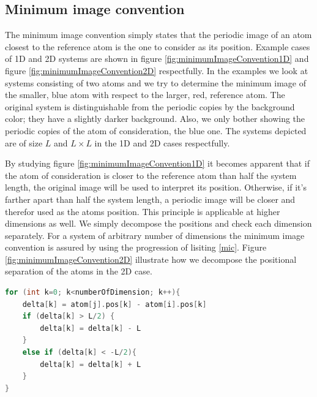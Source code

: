 \documentclass[twoside,english]{uiofysmaster}
\begin{document}
\subsection{Minimum image convention}
The minimum image convention simply states that the periodic image of an atom closest to the reference atom is the one to consider as its position. 
Example cases of 1D and 2D systems are shown in figure \ref{fig:minimumImageConvention1D} and figure \ref{fig:minimumImageConvention2D} respectfully. 
In the examples we look at systems consisting of two atoms and we try to determine the minimum image of the smaller, blue atom with respect to the larger, red, reference atom. 
The original system is distinguishable from the periodic copies by the background color; they have a slightly darker background. 
Also, we only bother showing the periodic copies of the atom of consideration, the blue one.  
The systems depicted are of size $L$ and $L\times L$ in the 1D and 2D cases respectfully.

By studying figure \ref{fig:minimumImageConvention1D} it becomes apparent that if the atom of consideration is closer to the reference atom than half the system length, the original image will be used to interpret its position. 
Otherwise, if it's farther apart than half the system length, a periodic image will be closer and therefor used as the atoms position.  
This principle is applicable at higher dimensions as well. We simply decompose the positions and check each dimension separately. For a system of arbitrary number of dimensions the minimum image convention is assured by using the progression of lisiting \ref{mic}. 
Figure \ref{fig:minimumImageConvention2D} illustrate how we decompose the positional separation of the atoms in the 2D case.

\begin{lstlisting}[caption={Loop to compute the position of the closest periodic image of atom $j$ with respect to the referance atom $i$.}, label={mic}, language=c++]
for (int k=0; k<numberOfDimension; k++){
	delta[k] = atom[j].pos[k] - atom[i].pos[k]
	if (delta[k] > L/2) {
		delta[k] = delta[k] - L
	}
	else if (delta[k] < -L/2){
		delta[k] = delta[k] + L
	}
}
\end{lstlisting}
\end{document}
